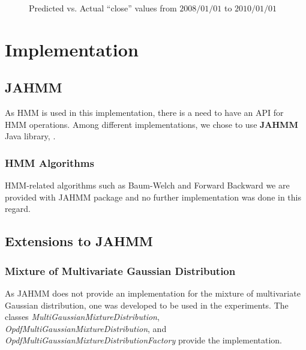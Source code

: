 \documentclass{acm_proc_article-sp}
\begin{document}
\begin{figure}[t]
\centering
\setlength\fboxsep{0.1pt}
\setlength\fboxrule{0.7pt}
\caption{Predicted vs. Actual ``close'' values from $2008/01/01$ to $2010/01/01$} \label{fig:res1}
\end{figure}

\section{Implementation} \label{sec:impl}

\subsection{JAHMM}
As HMM is used in this implementation, there is a need to have an API for HMM operations. Among different
implementations, we chose to use \textbf{JAHMM} Java library, \cite{jahmm}.

\subsubsection{HMM Algorithms}
HMM-related algorithms such as Baum-Welch and Forward Backward we are provided with JAHMM package and no further
implementation was done in this regard.

\subsection{Extensions to JAHMM}

\subsubsection{Mixture of Multivariate Gaussian Distribution}
As JAHMM does not provide an implementation for the mixture of multivariate Gaussian distribution, one was developed to
be used in the experiments. The classes \textit{MultiGaussianMixtureDistribution},
\textit{OpdfMultiGaussianMixtureDistribution}, and \textit{OpdfMultiGaussianMixtureDistributionFactory} provide the
implementation.
\end{document}
